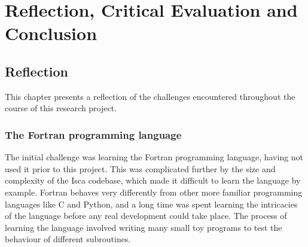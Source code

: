\documentclass[a4paper,11pt]{report}
\begin{document}

\part{Reflection, Critical Evaluation and Conclusion}


\chapter{Reflection}
This chapter presents a reflection of the challenges encountered throughout the course of this research project. 

\section{The Fortran programming language}
The initial challenge was learning the Fortran programming language, having not used it prior to this project. This was complicated further by the size and complexity of the Isca codebase, which made it difficult to learn the language by example. Fortran behaves very differently from other more familiar programming languages like C and Python, and a long time was spent learning the intricacies of the language before any real development could take place. The process of learning the language involved writing many small toy programs to test the behaviour of different subroutines. 
\end{document}
